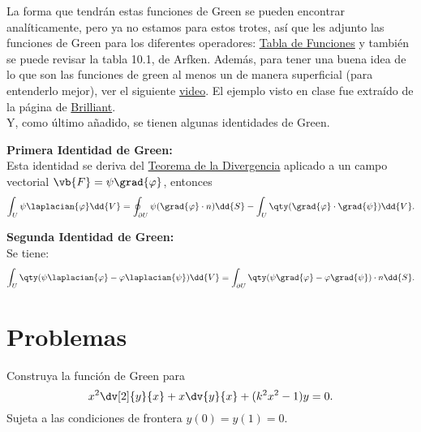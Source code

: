 La forma que tendrán estas funciones de Green se pueden encontrar analíticamente, pero ya no estamos para estos trotes, así que les adjunto las funciones de Green para los diferentes operadores: \href{https://en.wikipedia.org/wiki/Green\%27s_function#Table_of_Green's_functions}{Tabla de Funciones} y también se puede revisar la tabla 10.1, de Arfken. Además, para tener una buena idea de lo que son las funciones de green al menos un de manera superficial (para entenderlo mejor), ver el siguiente \href{https://youtu.be/ism2SfZgFJg?si=Mi-57CoReH2CGW91}{video}. El ejemplo visto en clase fue extraído de la página de \href{https://brilliant.org/wiki/greens-functions-in-physics/}{Brilliant}. \\

Y, como último añadido, se tienen algunas identidades de Green.

\begin{mdframed}[style=warning]
	{\Large \textbf{Primera Identidad de Green:}} \\
	Esta identidad se deriva del \href{https://en.wikipedia.org/wiki/Divergence_theorem}{Teorema de la Divergencia} aplicado a un campo vectorial $\vb{F} = \psi \grad{\varphi}$, entonces
		$$ \int _U \psi \laplacian{\varphi} \dd{V} = \oint _{\partial U} \psi (\grad{\varphi} \cdot n) \dd{S} - \int _U \qty(\grad{\varphi} \cdot \grad{\psi}) \dd{V}. $$
\end{mdframed}



\begin{mdframed}[style=warning]
	{\Large \textbf{Segunda Identidad de Green:}}\\
	Se tiene:
		$$ \int _U \qty(\psi \laplacian{\varphi} - \varphi \laplacian{\psi}) \dd{V} = \int _{\partial U} \qty(\psi \grad{\varphi} - \varphi \grad{\psi}) \cdot n \dd{S}. $$
\end{mdframed}







\pagebreak


\section*{Problemas}


\begin{ejercicio}
	Construya la función de Green para
		$$ x^2 \dv[2]{y}{x} + x\dv{y}{x} + (k^2 x^2 - 1)y = 0. $$
	Sujeta a las condiciones de frontera $y(0) = y(1) = 0$.
\end{ejercicio}












